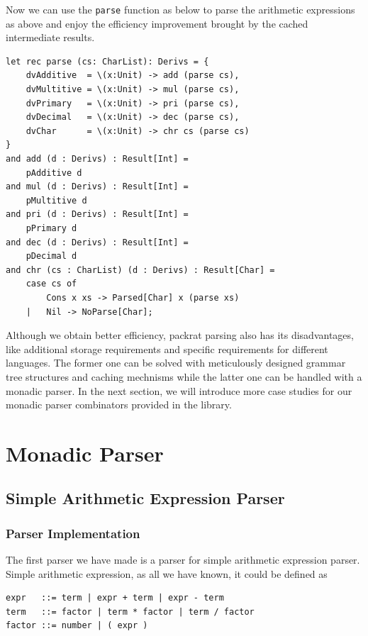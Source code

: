 Now we can use the \texttt{parse} function as below to parse the arithmetic expressions as above and enjoy the efficiency improvement brought by the cached intermediate results.

\begin{lstlisting}
let rec parse (cs: CharList): Derivs = {
    dvAdditive  = \(x:Unit) -> add (parse cs),
    dvMultitive = \(x:Unit) -> mul (parse cs),
    dvPrimary   = \(x:Unit) -> pri (parse cs),
    dvDecimal   = \(x:Unit) -> dec (parse cs),
    dvChar      = \(x:Unit) -> chr cs (parse cs)
}
and add (d : Derivs) : Result[Int] =
    pAdditive d
and mul (d : Derivs) : Result[Int] =
    pMultitive d
and pri (d : Derivs) : Result[Int] =
    pPrimary d
and dec (d : Derivs) : Result[Int] =
    pDecimal d
and chr (cs : CharList) (d : Derivs) : Result[Char] =
    case cs of
        Cons x xs -> Parsed[Char] x (parse xs)
    |   Nil -> NoParse[Char];
\end{lstlisting}

Although we obtain better efficiency, packrat parsing also has its disadvantages, like additional storage requirements and specific requirements for different languages. The former one can be solved with meticulously designed grammar tree structures and caching mechnisms while the latter one can be handled with a monadic parser. In the next section, we will introduce more case studies for our monadic parser combinators provided in the library.

\section{Monadic Parser}

\subsection{Simple Arithmetic Expression Parser} \label{section:simple_arith_expr_parser}

\subsubsection{Parser Implementation}

The first parser we have made is a parser for simple arithmetic expression parser. Simple arithmetic expression, as all we have known, it could be defined as

\begin{lstlisting}[language={}]
expr   ::= term | expr + term | expr - term
term   ::= factor | term * factor | term / factor
factor ::= number | ( expr )
\end{lstlisting}

